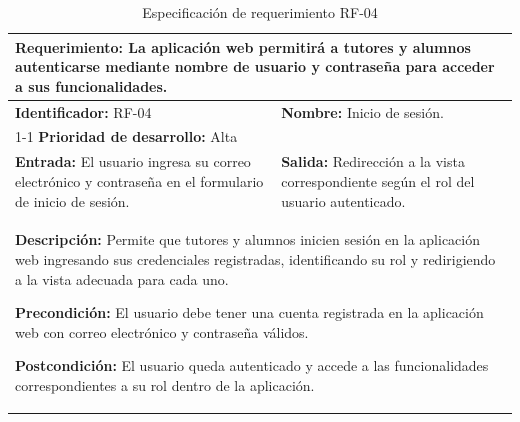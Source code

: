 \begin{table}[H]
\caption{Especificación de requerimiento RF-04}
\centering
\renewcommand{\arraystretch}{1.3}
\setlength{\tabcolsep}{6pt}
\begin{tabular}{|p{7cm}|p{8cm}|}
\hline
\multicolumn{2}{|p{15cm}|}{\textbf{Requerimiento:} La aplicación web permitirá a tutores y alumnos autenticarse mediante nombre de usuario y contraseña para acceder a sus funcionalidades.} \\ \hline
\textbf{Identificador:} RF-04 &
\textbf{Nombre:} Inicio de sesión. \\ \cline{1-1}
\textbf{Prioridad de desarrollo:} Alta &
\multicolumn{1}{p{8cm}|}{} \\ \hline
\textbf{Entrada:} El usuario ingresa su correo electrónico y contraseña en el formulario de inicio de sesión. &
\textbf{Salida:} Redirección a la vista correspondiente según el rol del usuario autenticado. \\ \hline
\multicolumn{2}{|p{15cm}|}{
\textbf{Descripción:} Permite que tutores y alumnos inicien sesión en la aplicación web ingresando sus credenciales registradas, identificando su rol y redirigiendo a la vista adecuada para cada uno.

\vspace{0.2cm}
\textbf{Precondición:} El usuario debe tener una cuenta registrada en la aplicación web con correo electrónico y contraseña válidos.

\vspace{0.2cm}
\textbf{Postcondición:} El usuario queda autenticado y accede a las funcionalidades correspondientes a su rol dentro de la aplicación.
} \\ \hline
\end{tabular}
\label{tab:rf04}
\end{table}

